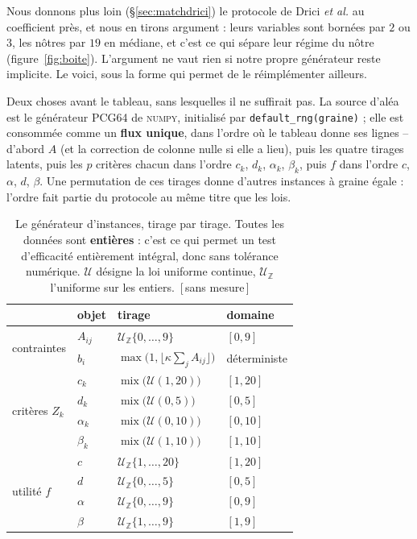 \documentclass[11pt,a4paper]{article}
\theoremstyle{plain}
\theoremstyle{remark}
\newcommand{\confna}{\textsf{\footnotesize[\,sans mesure\,]}}
\begin{document}
Nous donnons plus loin (§\ref{sec:matchdrici}) le protocole de Drici
\emph{et al.} au coefficient près, et nous en tirons argument : leurs
variables sont bornées par $2$ ou $3$, les nôtres par $19$ en médiane, et
c'est ce qui sépare leur régime du nôtre (figure~\ref{fig:boite}). L'argument
ne vaut rien si notre propre générateur reste implicite. Le voici, sous la
forme qui permet de le réimplémenter ailleurs.

Deux choses avant le tableau, sans lesquelles il ne suffirait pas. La source
d'aléa est le générateur PCG64 de \textsc{numpy}, initialisé par
\texttt{default\_rng(graine)} ;
elle est consommée comme un \textbf{flux unique}, dans l'ordre où le
tableau donne ses lignes -- d'abord $A$ (et la correction de colonne nulle
si elle a lieu), puis les quatre tirages latents, puis les $p$ critères
chacun dans l'ordre $c_k$, $d_k$, $\alpha_k$, $\beta_k$, puis $f$ dans
l'ordre $c$, $\alpha$, $d$, $\beta$. Une permutation de ces tirages donne
d'autres instances à graine égale : l'ordre fait partie du protocole au même
titre que les lois.

\begin{table}[H]
\centering
\caption{Le générateur d'instances, tirage par tirage. Toutes les données
sont \textbf{entières} : c'est ce qui permet un test d'efficacité
entièrement intégral, donc sans tolérance numérique. $\mathcal{U}$ désigne
la loi uniforme continue, $\mathcal{U}_{\mathbb{Z}}$ l'uniforme sur les
entiers.\ \confna}
\label{tab:generateur}
\setlength{\tabcolsep}{4pt}\small
\begin{tabular}{llll}
\toprule
& objet & tirage & domaine\\
\midrule
\multirow{2}{*}{contraintes}
 & $A_{ij}$ & $\mathcal{U}_{\mathbb{Z}}\{0,\dots,9\}$ & $[0,9]$\\
 & $b_i$ & $\max\bigl(1,\lfloor\kappa\sum_j A_{ij}\rfloor\bigr)$
   & déterministe\\
\midrule
\multirow{4}{*}{critères $Z_k$}
 & $c_k$ & $\operatorname{mix}\bigl(\mathcal{U}(1,20)\bigr)$ & $[1,20]$\\
 & $d_k$ & $\operatorname{mix}\bigl(\mathcal{U}(0,5)\bigr)$ & $[0,5]$\\
 & $\alpha_k$ & $\operatorname{mix}\bigl(\mathcal{U}(0,10)\bigr)$ & $[0,10]$\\
 & $\beta_k$ & $\operatorname{mix}\bigl(\mathcal{U}(1,10)\bigr)$ & $[1,10]$\\
\midrule
\multirow{4}{*}{utilité $f$}
 & $c$ & $\mathcal{U}_{\mathbb{Z}}\{1,\dots,20\}$ & $[1,20]$\\
 & $d$ & $\mathcal{U}_{\mathbb{Z}}\{0,\dots,5\}$ & $[0,5]$\\
 & $\alpha$ & $\mathcal{U}_{\mathbb{Z}}\{0,\dots,9\}$ & $[0,9]$\\
 & $\beta$ & $\mathcal{U}_{\mathbb{Z}}\{1,\dots,9\}$ & $[1,9]$\\
\bottomrule
\end{tabular}
\end{table}
\end{document}
